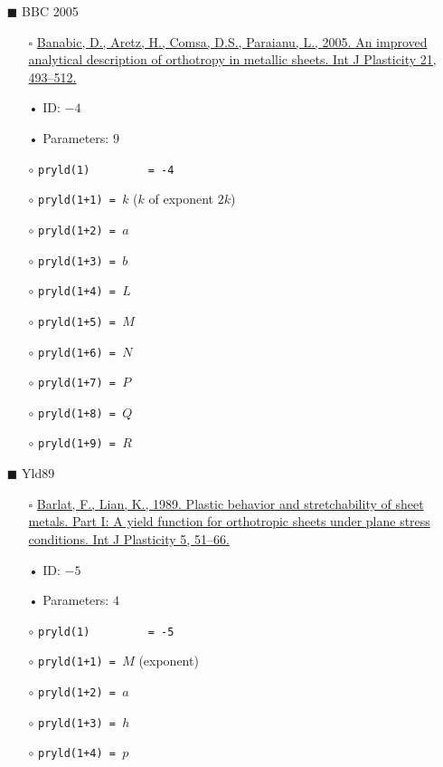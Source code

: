 \documentclass[11pt,a4paper,twoside,final,onecolumn,titlepage]{article}
\begin{document}
\begin{itemize}
	\item[\tiny$\blacksquare$] BBC 2005
	\begin{itemize}
		\item[\tiny$\square$] {\small \href{https://doi.org/10.1016/j.ijplas.2004.04.003}{Banabic, D., Aretz, H., Comsa, D.S., Paraianu, L., 2005. An improved analytical description of orthotropy in metallic sheets. Int J Plasticity 21, 493–512.}}\\
		\item[•] ID: $-4$
		\item[•] Parameters: $9$\\
		\item[$\circ$] \texttt{pryld(1)\,\,\,\,\,\,\,\,\,= -4}
		\item[$\circ$] \texttt{pryld(1+1) = $k$} ($k$ of exponent $2k$)
		\item[$\circ$] \texttt{pryld(1+2) = $a$}
		\item[$\circ$] \texttt{pryld(1+3) = $b$}
		\item[$\circ$] \texttt{pryld(1+4) = $L$}
		\item[$\circ$] \texttt{pryld(1+5) = $M$}
		\item[$\circ$] \texttt{pryld(1+6) = $N$}
		\item[$\circ$] \texttt{pryld(1+7) = $P$}
		\item[$\circ$] \texttt{pryld(1+8) = $Q$}
		\item[$\circ$] \texttt{pryld(1+9) = $R$}\\
	\end{itemize}
\end{itemize}

\newpage
\begin{itemize}
	\item[\tiny$\blacksquare$] Yld89
	\begin{itemize}
		\item[\tiny$\square$] {\small \href{https://doi.org/10.1016/0749-6419(89)90019-3}{Barlat, F., Lian, K., 1989. Plastic behavior and stretchability of sheet metals. Part I: A yield function for orthotropic sheets under plane stress conditions. Int J Plasticity 5, 51–66.}}\\
		\item[•] ID: $-5$
		\item[•] Parameters: $4$\\
		\item[$\circ$] \texttt{pryld(1)\,\,\,\,\,\,\,\,\,= -5}
		\item[$\circ$] \texttt{pryld(1+1) = $M$} (exponent)
		\item[$\circ$] \texttt{pryld(1+2) = $a$}
		\item[$\circ$] \texttt{pryld(1+3) = $h$}
		\item[$\circ$] \texttt{pryld(1+4) = $p$}\\
	\end{itemize}
\end{itemize}
\end{document}

